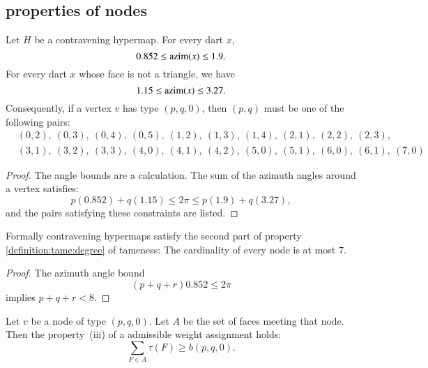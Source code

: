 \subsection{properties of nodes}




\begin{lemma} \label{lemma:0.852}
Let $H$ be a contravening
hypermap. For every dart $x$,
    $$0.852\le {\operatorname{azim}}(x)\le 1.9.$$
For every dart $x$ whose face is not a triangle, we have
    $$1.15\le{\operatorname{azim}}(x)\le 3.27.$$
Consequently, if a vertex $v$ has type $(p,q,0)$, then $(p,q)$
must be one of the following pairs:
$$
\begin{array}{lll}
&(0,2),~(0,3),~(0,4),~(0,5),~(1,2),~(1,3),~(1,4),~(2,1),~(2,2),~(2,3),\\
&(3,1),~(3,2),~(3,3),~(4,0),~(4,1),~(4,2),~(5,0),~(5,1),~(6,0),~(6,1),~(7,0)
\end{array}
$$
\end{lemma}
\begin{proof}
The angle bounds are a calculation.  The sum of the azimuth angles
around a vertex satisfies:
$$
  p (0.852) + q (1.15) \le 2\pi \le p (1.9) + q (3.27),
$$
and the pairs satisfying these constraints are listed.
\end{proof}

\begin{lemma} 
Formally contravening hypermaps satisfy the second part of property
\ref{definition:tame:degree} of tameness: The cardinality of every
node is at most $7$.
\end{lemma}

\begin{proof}  The azimuth angle bound
$$
 (p+q+r) 0.852 \le 2\pi
$$
implies $p+q+r < 8$.
\end{proof}




\begin{lemma} 
Let $v$ be a node of type $(p,q,0)$.  Let $A$ be the set of faces meeting that node.  Then the property~(iii) of a admissible weight assignment holds:
$$
\sum_{F\in A} \tau(F) \ge  b(p,q,0).
$$
\end{lemma}

